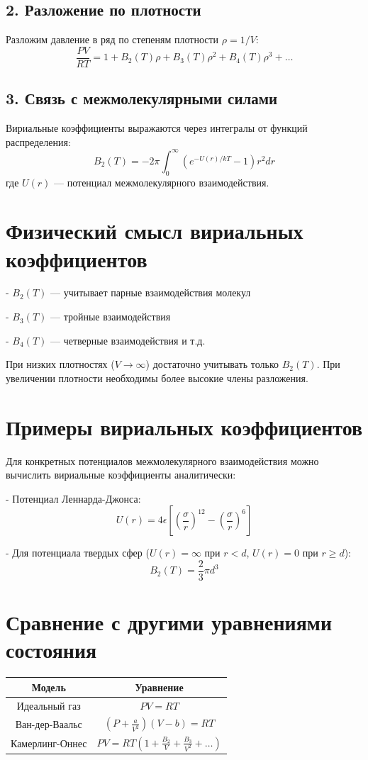 \documentclass[12pt]{article}
\begin{document}
\subsection{2. Разложение по плотности}
Разложим давление в ряд по степеням плотности $\rho = 1/V$:
\[
\frac{PV}{RT} = 1 + B_2(T)\rho + B_3(T)\rho^2 + B_4(T)\rho^3 + \dots
\]

\subsection{3. Связь с межмолекулярными силами}
Вириальные коэффициенты выражаются через интегралы от функций распределения:
\[
B_2(T) = -2\pi \int_0^\infty \left( e^{-U(r)/kT} - 1 \right) r^2 dr
\]
где $U(r)$ — потенциал межмолекулярного взаимодействия.

\section{Физический смысл вириальных коэффициентов}

    
- $B_2(T)$ — учитывает парные взаимодействия молекул
    
- $B_3(T)$ — тройные взаимодействия
    
- $B_4(T)$ — четверные взаимодействия и т.д.


При низких плотностях ($V \to \infty$) достаточно учитывать только $B_2(T)$. При увеличении плотности необходимы более высокие члены разложения.

\section{Примеры вириальных коэффициентов}
Для конкретных потенциалов межмолекулярного взаимодействия можно вычислить вириальные коэффициенты аналитически:

    
- Потенциал Леннарда-Джонса:
    $$
    U(r) = 4\epsilon \left[ \left( \frac{\sigma}{r} \right)^{12} - \left( \frac{\sigma}{r} \right)^6 \right]
    $$
    
- Для потенциала твердых сфер ($U(r)=\infty$ при $r<d$, $U(r)=0$ при $r\geq d$):
    $$
    B_2(T) = \frac{2}{3}\pi d^3
    $$


\section{Сравнение с другими уравнениями состояния}
\begin{center}
\begin{tabular}{|c|c|}
\hline
Модель & Уравнение \\
\hline
Идеальный газ & $PV = RT$ \\
\hline
Ван-дер-Ваальс & $\left(P + \frac{a}{V^2}\right)(V - b) = RT$ \\
\hline
Камерлинг-Оннес & $PV = RT\left(1 + \frac{B_2}{V} + \frac{B_3}{V^2} + \dots\right)$ \\
\hline
\end{tabular}
\end{center}
\end{document}
